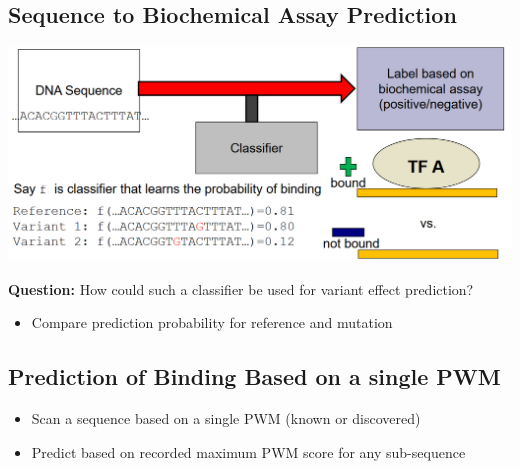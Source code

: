 \documentclass[10pt]{article}
\begin{document}
\subsection*{Sequence to Biochemical Assay Prediction}
\begin{center} 
	\includegraphics*[width=\textwidth]{W8_3.png} 
\end{center}
\textbf{Question:} How could such a classifier be used for variant effect prediction?
\begin{itemize}
	\item Compare prediction probability for reference and mutation
\end{itemize}

\subsection*{Prediction of Binding Based on a single PWM}
\begin{itemize}
	\item Scan a sequence based on a single PWM (known or discovered)
	\item Predict based on recorded maximum PWM score for any sub-sequence
\end{itemize}
\end{document}
